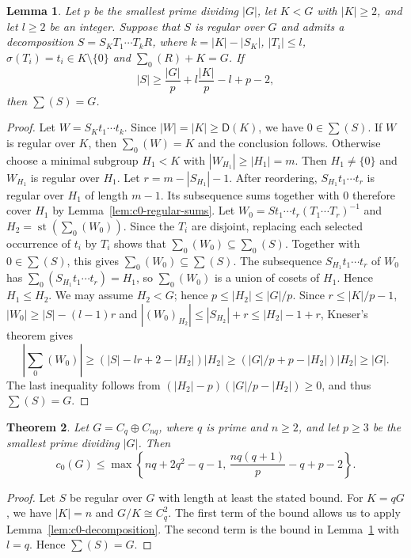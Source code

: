\documentclass[10pt,a4paper]{amsart}
\newtheorem{thm}{Theorem} [section]
\newtheorem{lem}[thm]{Lemma}
\theoremstyle{definition}
\theoremstyle{remark}
\numberwithin{equation}{section}
\DeclareMathOperator{\st}{st}
\begin{document}
\begin{lem}\label{lem:c0-KneserW0}
Let $p$ be the smallest prime dividing $|G|$, let $K<G$ with $|K|\ge2$, and let $l\ge2$ be an integer.
Suppose that $S$ is regular over $G$ and admits a decomposition
$S=S_KT_1\cdots T_kR$, where $k=|K|-|S_K|$,
$|T_i|\le l$, $\sigma(T_i)=t_i\in K\setminus\{0\}$ and $\sum_0(R)+K=G$.
If
\[
|S|\ge\frac{|G|}{p}+l\frac{|K|}{p}-l+p-2,
\]
then $\sum(S)=G$.
\end{lem}

\begin{proof}
Let $W=S_Kt_1\cdots t_k$. Since $|W|=|K|\ge \mathsf D(K)$, we have $0\in\sum(S)$.
If $W$ is regular over $K$, then $\sum_0(W)=K$ and the conclusion follows.
Otherwise choose a minimal subgroup $H_1<K$ with $|W_{H_1}|\ge|H_1|=m$.
Then $H_1\ne\{0\}$ and $W_{H_1}$ is regular over $H_1$.
Let $r=m-|S_{H_1}|-1$.
After reordering, $S_{H_1}t_1\cdots t_r$ is regular over $H_1$ of length $m-1$.
Its subsequence sums together with $0$ therefore cover $H_1$ by Lemma~\ref{lem:c0-regular-sums}.
Let $W_0=St_1\cdots t_r(T_1\cdots T_r)^{-1}$ and $H_2=\st(\sum_0(W_0))$.
Since the $T_i$ are disjoint, replacing each selected occurrence of
$t_i$ by $T_i$ shows that $\sum_0(W_0)\subseteq\sum_0(S)$.
Together with $0\in\sum(S)$, this gives $\sum_0(W_0)\subseteq\sum(S)$.
The subsequence $S_{H_1}t_1\cdots t_r$ of $W_0$ has
$\sum_0(S_{H_1}t_1\cdots t_r)=H_1$, so $\sum_0(W_0)$ is a union
of cosets of $H_1$. Hence $H_1\le H_2$.
We may assume $H_2<G$; hence $p\le|H_2|\le|G|/p$.
Since $r\le|K|/p-1$, $|W_0|\ge|S|-(l-1) r$ and
$|(W_0)_{H_2}|\le|S_{H_2}|+r\le|H_2|-1+r$, Kneser's theorem gives
\[
|\sum_0(W_0)|\ge(|S|-lr+2-|H_2|)|H_2|
\ge(|G|/p+p-|H_2|)|H_2|\ge|G|.
\]
The last inequality follows from $(|H_2|-p)(|G|/p-|H_2|)\ge0$, and thus $\sum(S)=G$.
\end{proof}

\begin{thm}\label{thm:unified-c0}
Let $G=C_q\oplus C_{nq}$, where $q$ is prime and $n\ge2$,
and let $p\ge3$ be the smallest prime dividing $|G|$. Then
\[
c_0(G)\le
\max\left\{nq+2q^2-q-1,\,
\frac{nq(q+1)}p-q+p-2\right\}.
\]
\end{thm}

\begin{proof}
Let $S$ be regular over $G$ with length at least the stated bound.
For $K=qG$, we have $|K|=n$ and $G/K\cong C_q^2$.
The first term of the bound allows us to apply Lemma~\ref{lem:c0-decomposition}.
The second term is the bound in Lemma~\ref{lem:c0-KneserW0} with $l=q$.
Hence $\sum(S)=G$.
\end{proof}
\end{document}
